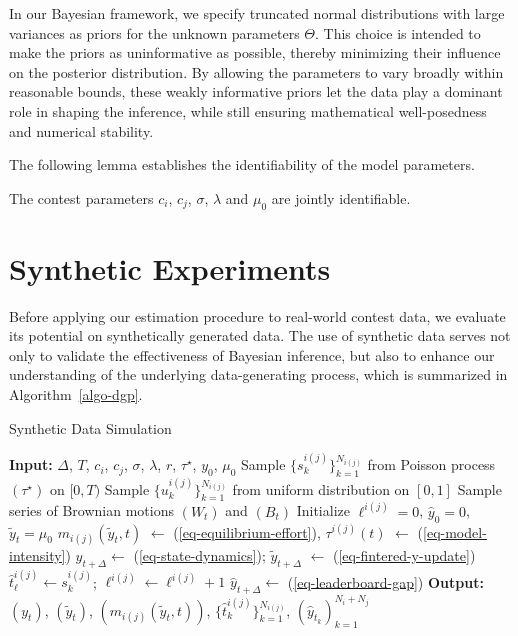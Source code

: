 \documentclass[mnsc]{informs3}
\begin{document}
In our Bayesian framework, we specify truncated normal distributions with large variances as priors for the unknown parameters $\Theta$.
This choice is intended to make the priors as uninformative as possible, thereby minimizing their influence on the posterior distribution. 
By allowing the parameters to vary broadly within reasonable bounds, these weakly informative priors let the data play a dominant role in shaping the inference, while still ensuring mathematical well-posedness and numerical stability.


The following lemma establishes the identifiability of the model parameters.

\begin{lemma}\label{lmm-params-identifiability}
The contest parameters $c_i$, $c_j$, $\sigma$, $\lambda$ and $\mu_0$ are jointly identifiable. 
\end{lemma}




\section{Synthetic Experiments}\label{sect-synthetic}

Before applying our estimation procedure to real-world contest data, we evaluate its potential on synthetically generated data. 
The use of synthetic data serves not only to validate the effectiveness of Bayesian inference, but also to enhance our understanding of the underlying data-generating process, which is summarized in Algorithm~\ref{algo-dgp}. 

\begin{algorithm}[H]
\caption{Synthetic Data Simulation}
\label{algo-dgp}
\begin{algorithmic}
\STATE \textbf{Input:} 
	$\Delta$, $T$, $c_i$, $c_j$, $\sigma$, $\lambda$, $r$, $\tau^\star$, $y_0$, $\mu_0$
\STATE Sample $\{s_k^{i(j)}\}^{N_{i(j)}}_{k=1}$ from Poisson process $(\tau^\star)$ on $[0, T)$
\STATE Sample $\{u_k^{i(j)}\}^{N_{i(j)}}_{k=1}$ from uniform distribution on $[0, 1]$
\STATE Sample series of Brownian motions $(W_t)$ and $(B_t)$
\STATE Initialize $\ell^{i(j)}=0$, $\hat{y}_0 = 0$, $\tilde{y}_t=\mu_0$
    \STATE $m_{i(j)}(\tilde{y}_t, t)$  $\gets$ (\ref{eq-equilibrium-effort}), $\tau^{i(j)}(t)$ $\gets$ (\ref{eq-model-intensity})
    \hfill {}
    \STATE $y_{t+\Delta} \gets$ (\ref{eq-state-dynamics}); $\tilde{y}_{t+\Delta}$ $\gets$ (\ref{eq-fintered-y-update})
    \hfill {}
    \FOR{$s_{k}^{i(j)} \in [t, t+\Delta)$} 
        	    \STATE $\hat{t}^{i(j)}_{\ell} \gets s_{k}^{i(j)}$; $\ell^{i(j)} \gets \ell^{i(j)}+1$
	    \hfill {}
	    \STATE $\hat{y}_{t+\Delta} \gets $ (\ref{eq-leaderboard-gap})
	    \hfill {}
        \ENDIF
    \ENDFOR
\ENDFOR
\STATE \textbf{Output:} $(y_t)$, $(\tilde{y}_t)$, $(m_{i(j)}(\tilde{y}_t, t))$, $\{\hat{t}_k^{i(j)}\}^{N_{i(j)}}_{k=1}$, $(\hat{y}_{t_k})_{k=1}^{N_i + N_j}$
\end{algorithmic}
\end{algorithm}
\end{document}
